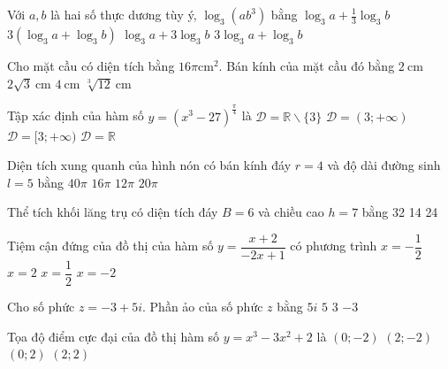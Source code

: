 \begin{ex}
	Với $a, b$ là hai số thực dương tùy ý, $\log _{3}\left(a b^{3}\right)$ bằng
	\choice
	{$\log _{3} a+\frac{1}{3} \log _{3} b$}
	{$ 3\left(\log _{3} a+\log _{3} b\right)$}
	{\True $ \log _{3} a+3 \log _{3} b$}
	{$3 \log _{3} a+\log _{3} b $}
\end{ex}

\begin{ex}
\end{ex}

\begin{ex}
Cho mặt cầu có diện tích bằng $16 \pi \mathrm{cm}^{2}$. Bán kính của mặt cầu đó bằng
\choice
{\True$ 2 \mathrm{~cm}$}
{$2 \sqrt{3} \mathrm{~cm}$}
{$4 \mathrm{~cm}$}
{$\sqrt[3]{12} \mathrm{~cm}$}
\end{ex}

\begin{ex}
Tập xác định của hàm số $y=\left(x^{3}-27\right)^{\frac{\pi}{4}}$ là
\choice
{$\mathscr{D}=\mathbb{R} \backslash\{3\}$}
{\True$ \mathscr{D}=(3 ;+\infty)$}
{$\mathscr{D}=[3 ;+\infty)$}
{$\mathscr{D}=\mathbb{R}$}
\end{ex}

\begin{ex}
Diện tích xung quanh của hình nón có bán kính đáy $r=4$ và độ dài đường sinh $l=5$ bằng
\choice
{$40 \pi$}
{$16 \pi$}
{$12 \pi$}
{\True$ 20 \pi$}
\end{ex}

\begin{ex}
Thể tích khối lăng trụ có diện tích đáy $B=6$ và chiều cao $h=7$ bằng
\choice
{}
{32}
{14}
{24}
\end{ex}

\begin{ex}
Tiệm cận đứng của đồ thị của hàm số $y=\dfrac{x+2}{-2 x+1}$ có phương trình
\choice
{$x=-\dfrac{1}{2}$}
{$x=2$}
{\True$ x=\dfrac{1}{2}$}
{$x=-2$}
\end{ex}
\begin{ex}
Cho số phức $z=-3+5i$. Phần ảo của số phức $z$ bằng
\choice
{$5i$}
{\True $5$}
{$3$}
{$-3$}
\end{ex}
\begin{ex}
Tọa độ điểm cực đại của đồ thị hàm số $y=x^{3}-3 x^{2}+2$ là
\choice
{$(0 ;-2)$}
{$(2 ;-2)$}
{\True $(0 ; 2)$}
{$(2 ; 2)$}
\end{ex}